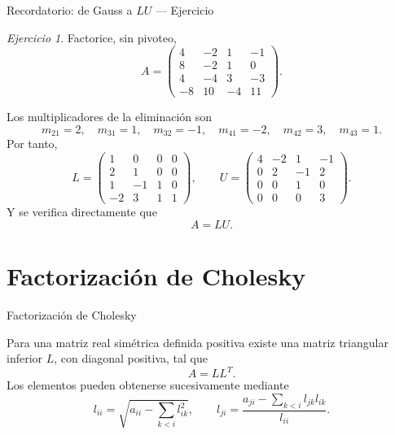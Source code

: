 \documentclass[aspectratio=169,11pt]{beamer}
\theoremstyle{remark}
\newtheorem{Ejer}[definicion]{Ejercicio}
\begin{document}
\begin{frame}[shrink=5]{Recordatorio: de Gauss a $LU$ — Ejercicio}
\footnotesize
\begin{Ejer} Factorice, sin pivoteo,
\[
A=\begin{pmatrix}4 & -2 & 1 & -1\\8 & -2 & 1 & 0\\4 & -4 & 3 & -3\\-8 & 10 & -4 & 11\end{pmatrix}.
\]

Los multiplicadores de la eliminación son
\[
m_{21}=2,\quad m_{31}=1,\quad m_{32}=-1,\quad m_{41}=-2,\quad m_{42}=3,\quad m_{43}=1.
\]
Por tanto,
\[
L=\begin{pmatrix}1 & 0 & 0 & 0\\2 & 1 & 0 & 0\\1 & -1 & 1 & 0\\-2 & 3 & 1 & 1\end{pmatrix},\qquad U=\begin{pmatrix}4 & -2 & 1 & -1\\0 & 2 & -1 & 2\\0 & 0 & 1 & 0\\0 & 0 & 0 & 3\end{pmatrix}.
\]
Y se verifica directamente que
\[
\boxed{A=LU}.
\]
\end{Ejer}
\end{frame}

\section{Factorización de Cholesky}
\begin{frame}[allowframebreaks]{Factorización de Cholesky}
\footnotesize

Para una matriz real simétrica definida positiva existe una matriz triangular inferior $L$, con diagonal positiva, tal que
\[
\boxed{A=LL^T}.
\]
Los elementos pueden obtenerse sucesivamente mediante
\[
l_{ii}=\sqrt{a_{ii}-\sum_{k<i}l_{ik}^2},\qquad
l_{ji}=\frac{a_{ji}-\sum_{k<i}l_{jk}l_{ik}}{l_{ii}}.
\]
\end{frame}
\end{document}
